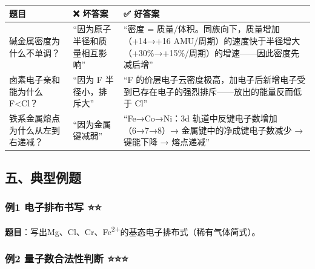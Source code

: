 \documentclass[a4paper,11pt]{ctexart}
\newcounter{none}
\begin{document}
{\def\LTcaptype{none} %
\begin{longtable}[]{@{}
  >{\raggedright\arraybackslash}p{}
  >{\raggedright\arraybackslash}p{}
  >{\raggedright\arraybackslash}p{}@{}}
\toprule\noalign{}
\begin{minipage}[b]{\linewidth}\raggedright
题目
\end{minipage} & \begin{minipage}[b]{\linewidth}\raggedright
❌ 坏答案
\end{minipage} & \begin{minipage}[b]{\linewidth}\raggedright
✅ 好答案
\end{minipage} \\
\midrule\noalign{}
\endhead
\bottomrule\noalign{}
\endlastfoot
碱金属密度为什么不单调？ & ``因为原子半径和质量相互影响'' & ``密度 = 质量/体积。同族向下，质量增加（+14→+16 AMU/周期）的速度快于半径增大（+30\%→+15\%/周期）的增速------因此密度先减后增'' \\
卤素电子亲和能为什么 F\textless Cl？ & ``因为 F 半径小，排斥大'' & ``F 的价层电子云密度极高，加电子后新增电子受到已存在电子的强烈排斥------放出的能量反而低于 Cl'' \\
铁系金属熔点为什么从左到右递减？ & ``因为金属键减弱'' & ``Fe→Co→Ni：3d 轨道中反键电子数增加（6→7→8）→ 金属键中的净成键电子数减少 → 键能下降 → 熔点递减'' \\
\end{longtable}
}

\subsection{五、典型例题}\label{ux4e94ux5178ux578bux4f8bux9898}

\subsubsection{例1 电子排布书写 ⭐⭐}\label{ux4f8b1-ux7535ux5b50ux6392ux5e03ux4e66ux5199}

\textbf{题目}：写出Mg、Cl、Cr、Fe\textsuperscript{2+}的基态电子排布式（稀有气体简式）。

\subsubsection{例2 量子数合法性判断 ⭐⭐⭐}\label{ux4f8b2-ux91cfux5b50ux6570ux5408ux6cd5ux6027ux5224ux65ad}
\end{document}
